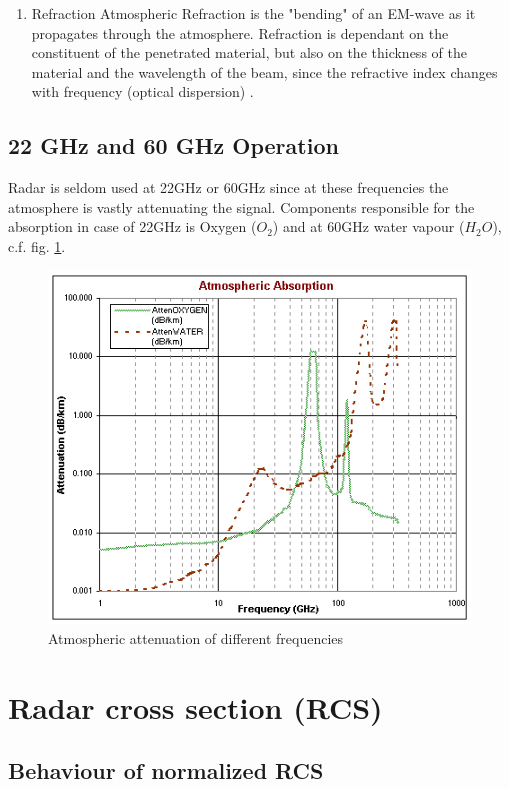 \begin{enumerate}
	\item Refraction
			Atmospheric Refraction is the "bending" of an EM-wave as it propagates through the atmosphere. Refraction is dependant on the constituent of the penetrated material, but also on the thickness of the material and the wavelength of the beam, since the refractive index changes with frequency (optical dispersion) \citep{erickson:lecture}.
	
\end{enumerate}



\subsection{22 GHz and 60 GHz Operation}
Radar is seldom used at 22GHz or 60GHz since at these frequencies the atmosphere is vastly attenuating the signal. Components responsible for the absorption in case of 22GHz is Oxygen ($O_2$) and at 60GHz water vapour ($H_2O$), c.f. fig. \ref{fig:absorb}.
\begin{figure}[h!]
	\centering
	\includegraphics[width=0.7\linewidth]{images/absorbtion}
	\caption{Atmospheric attenuation of different frequencies \protect\footnotemark}	
	\label{fig:absorb}
\end{figure}



\section{Radar cross section (RCS)}

\subsection{Behaviour of normalized RCS}

